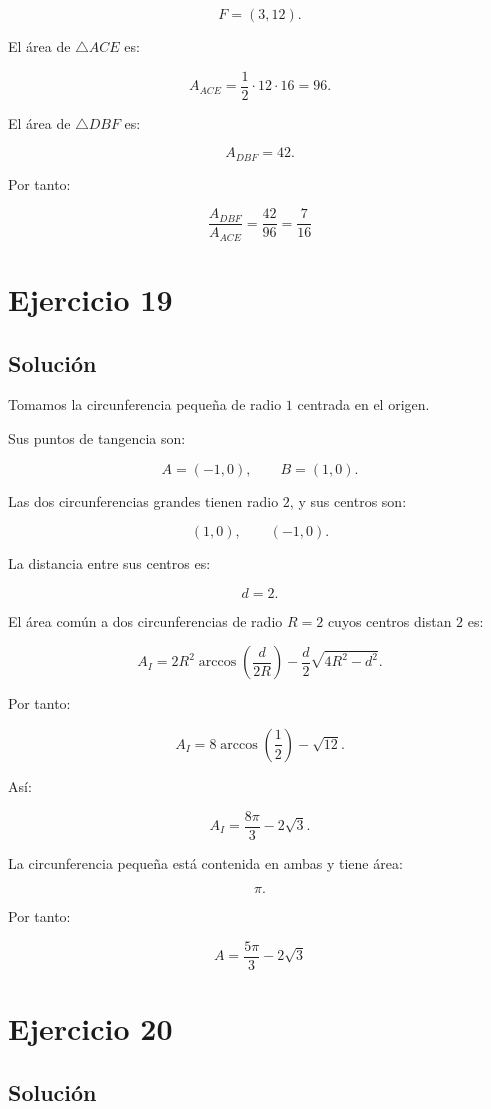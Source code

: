 \documentclass[11pt,a4paper]{article}
\begin{document}
\[
F=(3,12).
\]

El área de \(\triangle ACE\) es:

\[
A_{ACE}
=
\frac12\cdot12\cdot16
=
96.
\]

El área de \(\triangle DBF\) es:

\[
A_{DBF}=42.
\]

Por tanto:

\[
\boxed{
\frac{A_{DBF}}{A_{ACE}}
=
\frac{42}{96}
=
\frac7{16}
}
\]

\section{Ejercicio 19}
\subsection{Solución}

Tomamos la circunferencia pequeña de radio \(1\) centrada en el origen.

Sus puntos de tangencia son:

\[
A=(-1,0),
\qquad
B=(1,0).
\]

Las dos circunferencias grandes tienen radio \(2\), y sus centros son:

\[
(1,0),
\qquad
(-1,0).
\]

La distancia entre sus centros es:

\[
d=2.
\]

El área común a dos circunferencias de radio \(R=2\) cuyos centros distan \(2\) es:

\[
A_I
=
2R^2
\arccos\left(
\frac{d}{2R}
\right)
-
\frac d2
\sqrt{4R^2-d^2}.
\]

Por tanto:

\[
A_I
=
8\arccos\left(\frac12\right)
-
\sqrt{12}.
\]

Así:

\[
A_I
=
\frac{8\pi}{3}
-
2\sqrt3.
\]

La circunferencia pequeña está contenida en ambas y tiene área:

\[
\pi.
\]

Por tanto:

\[
\boxed{
A
=
\frac{5\pi}{3}
-
2\sqrt3
}
\]

\section{Ejercicio 20}
\subsection{Solución}
\end{document}
